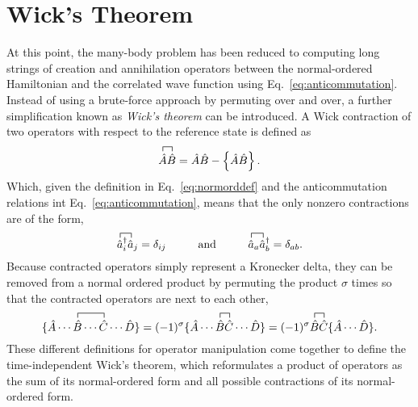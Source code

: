\documentclass[thesis.tex]{subfiles}
\begin{document}
\section{Wick's Theorem} \label{section:wicks_theorem}
At this point, the many-body problem has been reduced to computing long strings of creation and annihilation operators between the normal-ordered Hamiltonian and the correlated wave function using Eq.\ \eqref{eq:anticommutation}.  Instead of using a brute-force approach by permuting over and over, a further simplification known as \textit{Wick's theorem} \cite{WICK1950} can be introduced.  A Wick contraction of two operators with respect to the reference state is defined as
\begin{equation} \label{eq:wick1}
  \contraction[1.0ex]{}{\hat{A}}{}{\hat{B}}
  \hat{A}\hat{B} = \hat{A}\hat{B} - \normord{\hat{A}\hat{B}}.
\end{equation}
Which, given the definition in Eq.\ \eqref{eq:normorddef} and the anticommutation relations int Eq.\ \eqref{eq:anticommutation}, means that the only nonzero contractions are of the form,
\begin{equation} \label{eq:wick2}
  \contraction[1.0ex]{}{\hat{a}}{^{\dagger}_{i}}{\hat{a}}
  \hat{a}^{\dagger}_{i}\hat{a}_{j} = \delta_{ij} \hspace{1.0cm} \text{and} \hspace{1.0cm}
  \contraction[1.0ex]{}{\hat{a}}{_{a}}{\hat{a}}
  \hat{a}_{a}\hat{a}_{b}^{\dagger} = \delta_{ab}.
\end{equation}
Because contracted operators simply represent a Kronecker delta, they can be removed from a normal ordered product by permuting the product $\sigma$ times so that the contracted operators are next to each other,
\begin{equation} \label{eq:wick3}
  \contraction[1.0ex]{\{ \hat{A}\cdots}{\hat{B}}{\cdots}{\hat{C}}
  \{ \hat{A}\cdots\hat{B}\cdots\hat{C}\cdots\hat{D} \} = (-1)^{\sigma}
  \contraction[1.0ex]{\{ \hat{A}\cdots}{\hat{B}}{}{\hat{C}}
  \{ \hat{A}\cdots\hat{B}\hat{C}\cdots\hat{D} \} = (-1)^{\sigma}
  \contraction[1.0ex]{}{\hat{B}}{}{\hat{C}}
  \hat{B}\hat{C}\{ \hat{A}\cdots\hat{D} \}.
\end{equation}
These different definitions for operator manipulation come together to define the time-independent Wick's theorem, which reformulates a product of operators as the sum of its normal-ordered form and all possible contractions of its normal-ordered form.
\end{document}
